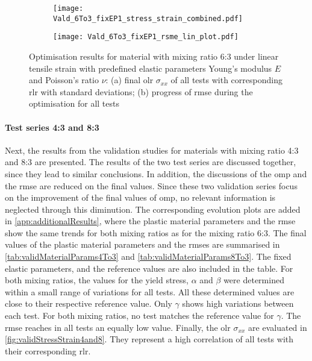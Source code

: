 \begin{figure}[H]
\centering
\begin{subfigure}[t]{0.495\textwidth}
    \centering
    \texttt{[image: Vald\_6To3\_fixEP1\_stress\_strain\_combined.pdf]}
    \caption{}
    \label{fig:validStressStrain6to3}
\end{subfigure}
\hfill
\begin{subfigure}[t]{0.495\textwidth}
    \centering
    \centering
    \texttt{[image: Vald\_6To3\_fixEP1\_rsme\_lin\_plot.pdf]}
    \caption{}
    \label{fig:validRMSE6to3}
\end{subfigure}
\caption{Optimisation results for material with mixing ratio 6:3 under linear tensile strain with predefined elastic parameters Young's modulus $E$ and Poisson's ratio $\nu$: (a) final \acrlong{olr} $\sigma_{xx}$ of all tests with corresponding \acrfull{rlr} with standard deviations; (b) progress of \acrfull{rmse} during the optimisation for all tests}
\label{fig:validRes6to3}
\end{figure}





\paragraph{Test series 4:3 and 8:3}
Next, the results from the validation studies for materials with mixing ratio 4:3 and 8:3 are presented. The results of the two test series are discussed together, since they lead to similar conclusions. In addition, the discussions of the \acrlong{omp} and the \acrshort{rmse} are reduced on the final values.  Since these two validation series focus on the improvement of the final values of \acrlong{omp}, no relevant information is neglected through this diminution.
The corresponding evolution plots are added in \autoref{app:additionalResults}, where the plastic material parameters and the \acrshort{rmse} show the same trends for both mixing ratios as for the mixing ratio 6:3.
The final values of the plastic material parameters and the \acrshort{rmse}s are summarised in \autoref{tab:validMaterialParams4To3} and \autoref{tab:validMaterialParams8To3}.
The fixed elastic parameters, and the reference values are also included in the table.
For both mixing ratios, the values for the yield stress, $\alpha$ and $\beta$ were determined within a small range of variations for all tests. All these determined values are close to their respective reference value.
Only $\gamma$ shows high variations between each test. For both mixing ratios, no test matches the reference value for $\gamma$. The \acrshort{rmse} reaches in all tests an equally low value. Finally, the \acrlong{olr} $\sigma_{xx}$ are evaluated in \autoref{fig:validStressStrain4and8}. They represent a high correlation of all tests with their corresponding \acrlong{rlr}.

